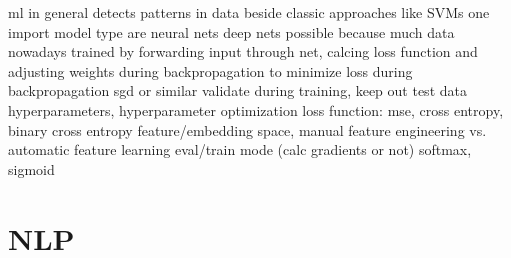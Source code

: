 ml in general detects patterns in data
beside classic approaches like SVMs one import model type are neural nets
deep nets possible because much data nowadays
trained by forwarding input through net, calcing loss function and adjusting weights during backpropagation to minimize loss
during backpropagation sgd or similar
validate during training, keep out test data
hyperparameters, hyperparameter optimization
loss function: mse, cross entropy, binary cross entropy
feature/embedding space, manual feature engineering vs. automatic feature learning
eval/train mode (calc gradients or not)
softmax, sigmoid

\section{NLP}
\label{sec:2_basics/3_neural_networks/1_nlp}

